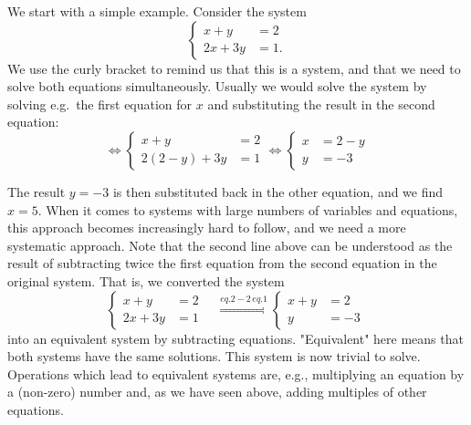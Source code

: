 \documentclass[
  a4paper,
  DIV=11,
  numbers=noendperiod,
  oneside]{scrreprt}
\theoremstyle{definition}
\theoremstyle{remark}
\begin{document}
We start with a simple example. Consider the system
\[ \left\{\begin{aligned}
x+y & = 2 \\
2x + 3y  & = 1.
\end{aligned} \right.\] We use the curly bracket to remind us that this
is a system, and that we need to solve both equations simultaneously.
Usually we would solve the system by solving e.g.~the first equation for
\(x\) and substituting the result in the second equation:
\[\Leftrightarrow  \left\{\begin{aligned}
x + y & = 2 \\
2(2-y) + 3y & = 1 
\end{aligned} \right. \Leftrightarrow  \left\{\begin{aligned}
x& = 2-y \\
 y & = -3 
\end{aligned} \right. \]

The result \(y=-3\) is then substituted back in the other equation, and
we find \(x=5\). When it comes to systems with large numbers of
variables and equations, this approach becomes increasingly hard to
follow, and we need a more systematic approach. Note that the second
line above can be understood as the result of subtracting twice the
first equation from the second equation in the original system. That is,
we converted the system \[ \left\{\begin{aligned}
x+  y &= 2  \\
2x + 3y  &=  1 
\end{aligned} \right. \quad \stackrel{eq.2 - 2\, eq.1}{\Longrightarrow} \left\{\begin{aligned}
x + y  &=  2 \\
      y &= -3 \  
\end{aligned} \right. \] into an equivalent system by subtracting
equations. "Equivalent" here means that both systems have the same
solutions. This system is now trivial to solve. Operations which lead to
equivalent systems are, e.g., multiplying an equation by a (non-zero)
number and, as we have seen above, adding multiples of other equations.
\end{document}
